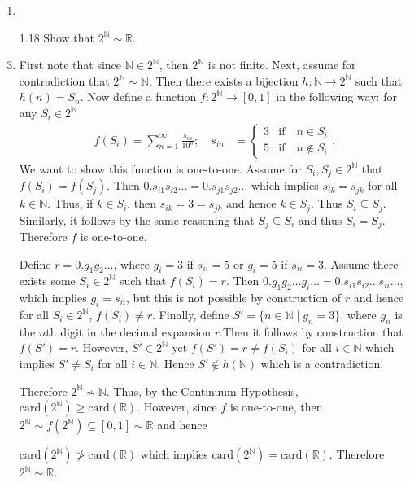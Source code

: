 \documentclass[12pt]{article}
\makeatletter
\theoremstyle{definition}
\theoremstyle{remark}
\renewenvironment{proof}[1][\proofname]{\par
  \pushQED{\qed}%
  \normalfont \topsep6\p@\@plus6\p@\relax
  \list{}{\leftmargin=0mm
          \rightmargin=4mm
          \settowidth{\itemindent}{\itshape#1}%
          \labelwidth=\itemindent
          \parsep=0pt \listparindent=\parindent 
  }
  \item[\hskip\labelsep
        \itshape
    #1\@addpunct{.}]\ignorespaces
}{%
  \popQED\endlist\@endpefalse
}
\let\oldproofname=\proofname
\renewcommand{\proofname}{\bf{\textit{\oldproofname}}}
\makeatother
\begin{document}
\begin{enumerate}[leftmargin=*]
\begin{proof}
            \end{proof}
        \item[1.18] Show that $2^{\mathbb{N}}\sim\mathbb{R}$.
            \begin{proof}
                First note that since $\mathbb{N}\in2^{\mathbb{N}}$, then $2^{\mathbb{N}}$ is not finite. Next, assume for contradiction that $2^{\mathbb{N}}\sim\mathbb{N}$. Then there exists a bijection $h\colon\mathbb{N}\rightarrow 2^{\mathbb{N}}$ such that $h(n)=S_n$. Now define a function $f\colon 2^{\mathbb{N}}\rightarrow[0,1]$ in the following way: for any $S_i\in 2^{\mathbb{N}}$
                    \begin{align*}
                        f(S_i)=\sum_{n=1}^{\infty}\frac{s_{in}}{10^{n}};\quad s_{in}&=\begin{cases} 3 &\text{if}\quad n\in S_i \\ 5 &\text{if}\quad n\notin S_i \end{cases}.
                    \end{align*}
                We want to show this function is one-to-one. Assume for $S_i,S_j\in 2^{\mathbb{N}}$ that $f(S_i)=f(S_j)$. Then $0.s_{i1}s_{i2}\dots=0.s_{j1}s_{j2}\dots$ which implies $s_{ik}=s_{jk}$ for all $k\in\mathbb{N}$. Thus, if $k\in S_i$, then $s_{ik}=3=s_{jk}$ and hence $k\in S_j$. Thus $S_i\subseteq S_j$. Similarly, it follows by the same reasoning that $S_j\subseteq S_i$ and thus $S_i=S_j$. Therefore $f$ is one-to-one.\par\hspace{4mm} Define $r=0.g_1g_2\dots$, where $g_i=3$ if $s_{ii}=5$ or $g_i=5$ if $s_{ii}=3$. Assume there exists some $S_i\in 2^{\mathbb{N}}$ such that $f(S_i)=r$. Then $0.g_1g_2\dots g_i\dots=0.s_{i1}s_{i2}\dots s_{ii}\dots$, which implies $g_i=s_{ii}$, but this is not possible by construction of $r$ and hence for all $S_i\in 2^{\mathbb{N}}$, $f(S_i)\neq r$. Finally, define $S'=\{n\in\mathbb{N}\mid g_n=3\}$, where $g_n$ is the $n$th digit in the decimal expansion $r$.Then it follows by construction that $f(S')=r$. However, $S'\in 2^{\mathbb{N}}$ yet $f(S')=r\neq f(S_i)$ for all $i\in\mathbb{N}$ which implies $S'\neq S_i$ for all $i\in\mathbb{N}$. Hence $S'\notin h(\mathbb{N})$ which is a contradiction.\par\hspace{4mm} Therefore $2^{\mathbb{N}}\not\sim\mathbb{N}$. Thus, by the Continuum Hypothesis, $\text{card}(2^{\mathbb{N}})\geq\text{card}(\mathbb{R})$. However, since $f$ is one-to-one, then $2^\mathbb{N}\sim f(2^{\mathbb{N}})\subseteq [0,1]\sim\mathbb{R}$ and hence\par $\text{card}(2^{\mathbb{N}})\not>\text{card}(\mathbb{R})$ which implies $\text{card}(2^{\mathbb{N}})=\text{card}(\mathbb{R})$. Therefore $2^{\mathbb{N}}\sim\mathbb{R}$.

\end{proof}
\end{enumerate}
\end{document}
